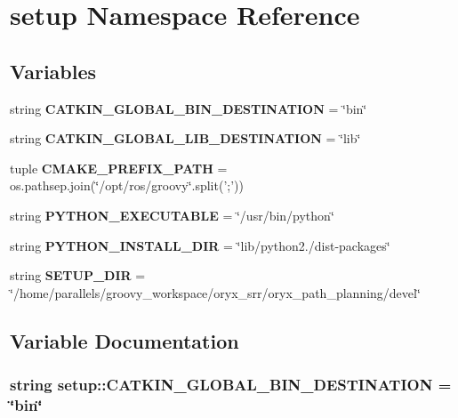 \section{setup \-Namespace \-Reference}
\label{namespacesetup}
\subsection*{\-Variables}
\begin{DoxyCompactItemize}
\item 
string {\bf \-C\-A\-T\-K\-I\-N\-\_\-\-G\-L\-O\-B\-A\-L\-\_\-\-B\-I\-N\-\_\-\-D\-E\-S\-T\-I\-N\-A\-T\-I\-O\-N} = \char`\"{}bin\char`\"{}
\item 
string {\bf \-C\-A\-T\-K\-I\-N\-\_\-\-G\-L\-O\-B\-A\-L\-\_\-\-L\-I\-B\-\_\-\-D\-E\-S\-T\-I\-N\-A\-T\-I\-O\-N} = \char`\"{}lib\char`\"{}
\item 
tuple {\bf \-C\-M\-A\-K\-E\-\_\-\-P\-R\-E\-F\-I\-X\-\_\-\-P\-A\-T\-H} = os.\-pathsep.\-join(\char`\"{}/opt/ros/groovy\char`\"{}.split(';'))
\item 
string {\bf \-P\-Y\-T\-H\-O\-N\-\_\-\-E\-X\-E\-C\-U\-T\-A\-B\-L\-E} = \char`\"{}/usr/bin/python\char`\"{}
\item 
string {\bf \-P\-Y\-T\-H\-O\-N\-\_\-\-I\-N\-S\-T\-A\-L\-L\-\_\-\-D\-I\-R} = \char`\"{}lib/python2./dist-\/packages\char`\"{}
\item 
string {\bf \-S\-E\-T\-U\-P\-\_\-\-D\-I\-R} = \char`\"{}/home/parallels/groovy\-\_\-workspace/oryx\-\_\-srr/oryx\-\_\-path\-\_\-planning/devel\char`\"{}
\end{DoxyCompactItemize}


\subsection{\-Variable \-Documentation}
\subsubsection[{\-C\-A\-T\-K\-I\-N\-\_\-\-G\-L\-O\-B\-A\-L\-\_\-\-B\-I\-N\-\_\-\-D\-E\-S\-T\-I\-N\-A\-T\-I\-O\-N}]{\setlength{\rightskip}{0pt plus 5cm}string {\bf setup\-::\-C\-A\-T\-K\-I\-N\-\_\-\-G\-L\-O\-B\-A\-L\-\_\-\-B\-I\-N\-\_\-\-D\-E\-S\-T\-I\-N\-A\-T\-I\-O\-N} = \char`\"{}bin\char`\"{}}\label{namespacesetup_ad6d0d2d2612bf52d17f8f976115653be}


